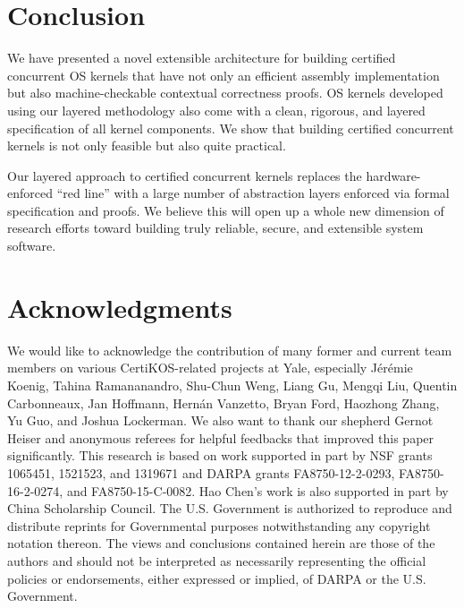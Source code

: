 \section{Conclusion}
\label{sec:concl}

We have presented a novel extensible architecture for building
certified concurrent OS kernels that have not only an efficient
assembly implementation but also machine-checkable contextual
correctness proofs.  OS kernels developed using our layered
methodology also come with a clean, rigorous, and layered
specification of all kernel components.  We show that building
certified concurrent kernels is not only feasible but also
quite practical. 
Our layered approach to certified concurrent kernels replaces the
hardware-enforced ``red line'' with a large number of abstraction
layers enforced via formal specification and proofs. We believe this
will open up a whole new dimension of research efforts toward building
truly reliable, secure, and extensible system software.  


\ignore{
}

\section*{Acknowledgments}
We would like to acknowledge the contribution of many former and
current team members on various CertiKOS-related projects at Yale,
especially Jérémie Koenig, Tahina Ramananandro, Shu-Chun Weng, Liang
Gu, Mengqi Liu, Quentin Carbonneaux, Jan Hoffmann, Hernán Vanzetto,
Bryan Ford, Haozhong Zhang, Yu Guo, and Joshua Lockerman. We also want
to thank our shepherd Gernot Heiser and anonymous referees for helpful
feedbacks that improved this paper significantly.  This research is
based on work supported in part by NSF grants 1065451, 1521523, and
1319671 and DARPA grants FA8750-12-2-0293, FA8750-16-2-0274, and
FA8750-15-C-0082.  Hao Chen's work is also supported in part by China
Scholarship Council. The U.S. Government is authorized to reproduce
and distribute reprints for Governmental purposes notwithstanding any
copyright notation thereon. The views and conclusions contained herein
are those of the authors and should not be interpreted as necessarily
representing the official policies or endorsements, either expressed
or implied, of DARPA or the U.S. Government.

